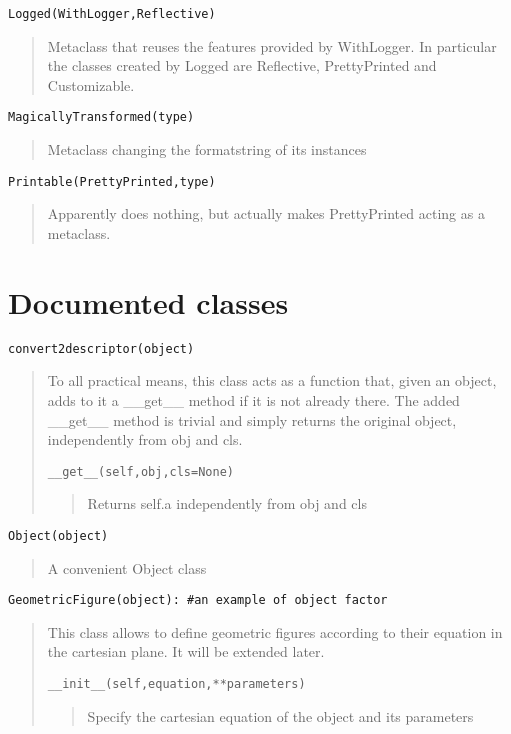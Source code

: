 \documentclass[10pt,english]{article}
\begin{document}
\texttt{Logged(WithLogger,Reflective)}
\begin{quote}

Metaclass that reuses the features provided by WithLogger. 
In particular the classes created by Logged are Reflective, 
PrettyPrinted and Customizable.
\end{quote}

\texttt{MagicallyTransformed(type)}
\begin{quote}

Metaclass changing the formatstring of its instances
\end{quote}

\texttt{Printable(PrettyPrinted,type)}
\begin{quote}

Apparently does nothing, but actually makes PrettyPrinted acting as
a metaclass.
\end{quote}



\hypertarget{documented-classes}{}
\section*{Documented classes}

\texttt{convert2descriptor(object)}
\begin{quote}

To all practical means, this class acts as a function that, given an
object, adds to it a {\_}{\_}get{\_}{\_} method if it is not already there. The 
added {\_}{\_}get{\_}{\_} method is trivial and simply returns the original object, 
independently from obj and cls.

\texttt{{\_}{\_}get{\_}{\_}(self,obj,cls=None)}
\begin{quote}

Returns self.a independently from obj and cls
\end{quote}
\end{quote}

\texttt{Object(object)}
\begin{quote}

A convenient Object class
\end{quote}

\texttt{GeometricFigure(object): {\#}an example of object factor}
\begin{quote}

This class allows to define geometric figures according to their
equation in the cartesian plane. It will be extended later.

\texttt{{\_}{\_}init{\_}{\_}(self,equation,**parameters)}
\begin{quote}

Specify the cartesian equation of the object and its parameters
\end{quote}
\end{quote}
\end{document}
